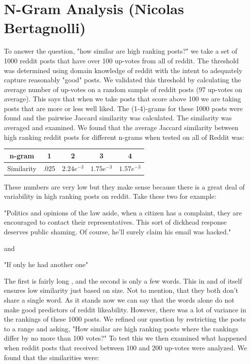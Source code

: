 \documentclass[12pt]{article}
\numberwithin{equation}{section}
\begin{document}
\section*{N-Gram Analysis (Nicolas Bertagnolli)}
	To answer the question, "how similar are high ranking posts?" we take a set of 1000 reddit posts that have over 100 up-votes from all of reddit.  The threshold was determined using domain knowledge of reddit with the intent to adequately capture reasonably "good" posts.   We validated this threshold by calculating the average number of up-votes on a random sample of reddit posts (97 up-votes on average).  This says that when we take posts that score above 100 we are taking posts that are more or less well liked.   The (1-4)-grams for these 1000 posts were found and the pairwise Jaccard similarity was calculated.  The similarity was averaged and examined.  We found that the average Jaccard similarity between high ranking reddit posts for different n-grams when tested on all of Reddit was:\newline
	\begin{table}[h!]
	  \begin{tabular}{c | c c c c}
	  n-gram & 1 & 2 & 3 & 4\\
	  \hline
	  Similarity & .025 & $2.24e^{-3}$ & $1.75e^{-3}$ & $1.57e^{-3}$
	  \end{tabular}
	\end{table}
	
	These numbers are very low but they make sense because there is a great deal of variability in high ranking posts on reddit.  Take these two for example:\newline
	
	"Politics and opinions of the law aside, when a citizen has a complaint, they are encouraged to contact their representatives.  This sort of dickhead response deserves public shaming. Of course, he'll surely claim his email was hacked."\newline
	
	and \newline
	
	"If only he had another one"
	
	The first is fairly long , and the second is only a few words.  This in and of itself ensures low similarity just based on size.  Not to mention, that they both don't share a single word.  As it stands now we can say that the words alone do not make good predictors of reddit likeability.  However, there was a lot of variance in the rankings of these 1000 posts. We refined our question by restricting the posts to a range and asking, "How similar are high ranking posts where the rankings differ by no more than 100 votes?" To test this we then examined what happened when reddit posts that received between 100 and 200 up-votes were analyzed.  We found that the similarities were:\newline
	
\end{document}
